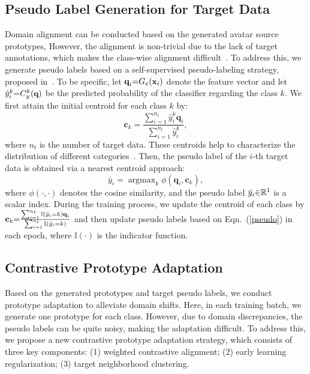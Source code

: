 \documentclass{article}
\begin{document}
\subsection{Pseudo Label Generation for Target Data}
\label{sec:pse}
Domain alignment can be conducted based on the generated avatar source prototypes, However, the alignment is non-trivial due to the lack of target annotations, which makes the class-wise alignment  difficult~\cite{pei2018multi,Kang2019ContrastiveAN}. To address this, we generate pseudo labels based on a self-supervised pseudo-labeling strategy, proposed in~\cite{liang2020shot}. To be specific, let $\textbf{q}_i \small{=}G_{e}(\textbf{x}_i)$ denote  the feature vector and let $\hat{y}_i^k \small{=} C_{y}^{k}(\textbf{q})$ be the predicted probability of the classifier regarding the class $k$. We first attain the initial centroid for each class $k$ by:
\begin{equation}
\textbf{c}_{k} = \frac{\sum_{i=1}^{n_{t}} \hat{y}_i^k  \textbf{q}_i}{\sum_{i=1}^{n_{t}} \hat{y}_i^k},
\end{equation}
where $n_{t}$ is the number of target data. These centroids help to characterize  the distribution of different categories~\cite{liang2020shot}. Then, the pseudo label  of the $i$-th target data is obtained via a nearest centroid approach:
\begin{equation}\label{pseudo}
\bar{y}_{i} = \mathop{\arg\max}_{k}\phi(\textbf{q}_i, \textbf{c}_{k}),
\end{equation}
where $\phi(\cdot,\cdot)$ denotes the cosine similarity, and the pseudo label  $\bar{y}_{i}\small{\in}\mathbb{R}^1$ is a scalar index. 
During the training process, we update the centroid of each class by 
$\textbf{c}_{k}  \small{=} \frac{\sum_{i=1}^{n_{t}} \mathbb{I}(\bar{y}_{i}\small{=}k)   \textbf{q}_i}{\sum_{i=1}^{n_{t}}\mathbb{I}(\bar{y}_{i}\small{=}k)}$ and then update  pseudo labels based on Eqn.~(\ref{pseudo})  in  each   epoch,
where $\mathbb{I}(\cdot)$ is the indicator function. 


\subsection{Contrastive Prototype Adaptation}\label{stage2} 
Based on the generated prototypes and target pseudo labels, we conduct prototype adaptation to alleviate domain shifts. Here, in each training batch, we generate one prototype for each class. 
However, due to domain discrepancies, the pseudo labels can be quite noisy, making the adaptation difficult. 
To address this, we propose a new contrastive prototype adaptation strategy, which consists of three key components: (1) weighted contrastive alignment; (2) early learning regularization; (3) target neighborhood clustering. 
\end{document}
